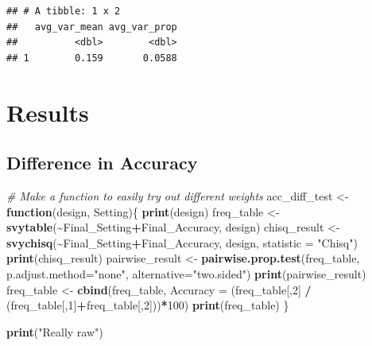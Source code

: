 \documentclass[
]{article}
\newenvironment{Shaded}{\begin{snugshade}}{\end{snugshade}}
\newcommand{\AttributeTok}[1]{\textcolor[rgb]{0.13,0.29,0.53}{#1}}
\newcommand{\CommentTok}[1]{\textcolor[rgb]{0.56,0.35,0.01}{\textit{#1}}}
\newcommand{\ControlFlowTok}[1]{\textcolor[rgb]{0.13,0.29,0.53}{\textbf{#1}}}
\newcommand{\DecValTok}[1]{\textcolor[rgb]{0.00,0.00,0.81}{#1}}
\newcommand{\FunctionTok}[1]{\textcolor[rgb]{0.13,0.29,0.53}{\textbf{#1}}}
\newcommand{\NormalTok}[1]{#1}
\newcommand{\OtherTok}[1]{\textcolor[rgb]{0.56,0.35,0.01}{#1}}
\newcommand{\SpecialCharTok}[1]{\textcolor[rgb]{0.81,0.36,0.00}{\textbf{#1}}}
\newcommand{\StringTok}[1]{\textcolor[rgb]{0.31,0.60,0.02}{#1}}
\begin{document}
\begin{verbatim}
## # A tibble: 1 x 2
##   avg_var_mean avg_var_prop
##          <dbl>        <dbl>
## 1        0.159       0.0588
\end{verbatim}

\section{Results}\label{results}

\subsection{Difference in Accuracy}\label{difference-in-accuracy}

\begin{Shaded}
\begin{Highlighting}[]
\CommentTok{\# Make a function to easily try out different weights}
\NormalTok{acc\_diff\_test }\OtherTok{\textless{}{-}} \ControlFlowTok{function}\NormalTok{(design, Setting)\{}
  \FunctionTok{print}\NormalTok{(design)}
\NormalTok{  freq\_table }\OtherTok{\textless{}{-}} \FunctionTok{svytable}\NormalTok{(}\SpecialCharTok{\textasciitilde{}}\NormalTok{Final\_Setting}\SpecialCharTok{+}\NormalTok{Final\_Accuracy, design)}
\NormalTok{  chisq\_result }\OtherTok{\textless{}{-}} \FunctionTok{svychisq}\NormalTok{(}\SpecialCharTok{\textasciitilde{}}\NormalTok{Final\_Setting}\SpecialCharTok{+}\NormalTok{Final\_Accuracy, design, }\AttributeTok{statistic =} \StringTok{"Chisq"}\NormalTok{)}
  \FunctionTok{print}\NormalTok{(chisq\_result)}
\NormalTok{  pairwise\_result }\OtherTok{\textless{}{-}} \FunctionTok{pairwise.prop.test}\NormalTok{(freq\_table, }\AttributeTok{p.adjust.method=}\StringTok{"none"}\NormalTok{, }\AttributeTok{alternative=}\StringTok{"two.sided"}\NormalTok{)}
  \FunctionTok{print}\NormalTok{(pairwise\_result)}
\NormalTok{  freq\_table }\OtherTok{\textless{}{-}} \FunctionTok{cbind}\NormalTok{(freq\_table, }\AttributeTok{Accuracy =}\NormalTok{ (freq\_table[,}\DecValTok{2}\NormalTok{] }\SpecialCharTok{/}\NormalTok{ (freq\_table[,}\DecValTok{1}\NormalTok{]}\SpecialCharTok{+}\NormalTok{freq\_table[,}\DecValTok{2}\NormalTok{]))}\SpecialCharTok{*}\DecValTok{100}\NormalTok{)}
  \FunctionTok{print}\NormalTok{(freq\_table)}
\NormalTok{\}}

\FunctionTok{print}\NormalTok{(}\StringTok{"Really raw"}\NormalTok{)}
\end{Highlighting}
\end{Shaded}
\end{document}
